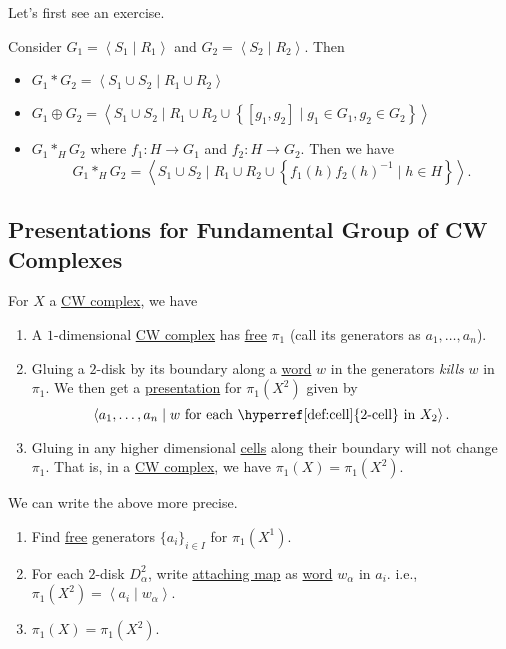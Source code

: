Let's first see an exercise.
\begin{exercise}
	Consider \(G_1 = \left< S_1 \mid R_1 \right> \) and \(G_2 = \left< S_2 \mid R_2 \right> \). Then
	\begin{itemize}
		\item \(G_1\ast G_2 = \left< S_{1}\cup S_2  \mid R_1 \cup R_2 \right> \)
		\item \(G_1\oplus G_2 = \left< S_1 \cup S_2  \mid R_1 \cup R_2\cup \left\{[g_1, g_2] \mid g_1\in G_1, g_2\in G_2\right\} \right> \)
		\item \(G_1 \ast_H G_2 \) where \(f_1\colon H\to G_1\) and \(f_2\colon H\to G_2\). Then we have
		      \[
			      G_1\ast_H G_2 = \left< S_1 \cup S_2  \mid R_1 \cup  R_2\cup \left\{f_1(h)f_2(h)^{-1}  \mid h\in H\right\} \right>.
		      \]
	\end{itemize}
\end{exercise}

\subsection{Presentations for Fundamental Group of CW Complexes}
For \(X\) a \hyperref[def:CW-Complex]{CW complex}, we have
\begin{enumerate}[(1)]
	\item A \(1\)-dimensional \hyperref[def:CW-Complex]{CW complex} has \hyperref[def:free-group]{free} \(\pi _1\) (call its generators as \(a_1, \ldots , a_n \)).
	\item Gluing a \(2\)-disk by its boundary along a \hyperref[def:word]{word} \(w\) in the generators \emph{kills} \(w\) in \(\pi _1\). We then get a
	      \hyperref[def:group-presentation]{presentation} for \(\pi _1(X^2)\) given by
	      \[
		      \left< a_1, \ldots , a_n \mid w \text{ for each \hyperref[def:cell]{\(2\)-cell} in \(X_2\)}\right>.
	      \]
	\item Gluing in any higher dimensional \hyperref[def:cell]{cells} along their boundary will not change \(\pi _1\). That is, in a \hyperref[def:CW-Complex]{CW complex},
	      we have \(\pi _1(X) = \pi _1(X^2)\).
\end{enumerate}

\begin{remark}
	We can write the above more precise.
	\begin{enumerate}[(1)]
		\item Find \hyperref[def:free-group]{free} generators \(\{a _i\}_{i\in I}\) for \(\pi _1(X^1)\).
		\item For each \(2\)-disk \(D^2_\alpha \), write \hyperref[def:attaching-map]{attaching map} as \hyperref[def:word]{word} \(w_\alpha \) in \(a_{i}\). i.e.,
		      \(\pi _1(X^2) = \left< a_{i} \mid w_\alpha  \right>\).
		\item \(\pi_1(X) = \pi _1(X^2)\).
	\end{enumerate}
\end{remark}

